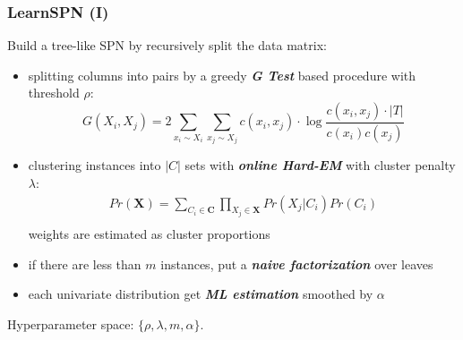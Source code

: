 \documentclass[xcolor={usenames,dvipsnames,svgnames}, compress]{beamer}
\begin{document}
\begin{frame}[t]
  \frametitle{LearnSPN (I)}
  \footnotesize
  Build a tree-like SPN by recursively split the data matrix:

  \begin{itemize}
  \item splitting columns into pairs by a greedy \textbf{\emph{G Test}} based
    procedure with threshold $\rho$:
    \[
    G(X_i, X_j) =  2\sum_{x_i \sim X_i}\sum_{x_j \sim X_j}c(x_i, x_j)\cdot \log\frac{c(x_i, x_j)\cdot |T|}{c(x_i)c(x_j)}
    \]
  \item clustering instances into $|C|$ sets with \textbf{\emph{online Hard-EM}} with cluster penalty
    $\lambda$:
    \[\begin{array}{cc}
        Pr(\mathbf{X})= \sum_{C_i \in \mathbf{C}}\prod_{X_j \in \mathbf{X}}Pr(X_j|C_i)Pr(C_i)\\
      \end{array}\]
      weights are estimated as cluster proportions
  \item if there are less than $m$ instances, put a \textbf{\emph{naive
    factorization}} over leaves
  \item each univariate distribution get \emph{\textbf{ML estimation}} smoothed by $\alpha$  
  \end{itemize}\par\bigskip

  Hyperparameter space: $\{\rho, \lambda, m, \alpha\}$.
  

\end{frame}
\end{document}
